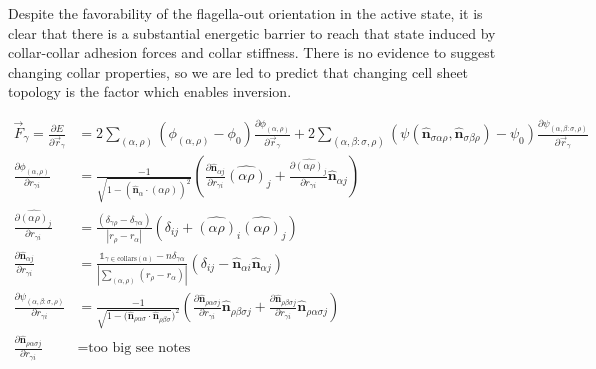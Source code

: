 Despite the favorability of the flagella-out orientation in the active state, it is clear that there is a substantial energetic barrier to reach that state induced by collar-collar adhesion forces and collar stiffness. 
There is no evidence to suggest changing collar properties, so we are led to predict that changing cell sheet topology is the factor which enables inversion.




\begin{align*}
    \vec{F}_\gamma = \frac{\partial E}{\partial \vec{r}_\gamma} &= 2 \sum_{(\alpha, \rho)} \left( \phi_{(\alpha,\rho)} - \phi_0 \right) \frac{\partial \phi_{(\alpha,\rho)}}{\partial \vec{r}_\gamma} + 2 \sum_{(\alpha, \beta: \sigma, \rho)} \left( \psi(\hat{\bm{n}}_{\sigma\alpha\rho}, \hat{\bm{n}}_{\sigma\beta\rho}) - \psi_0 \right) \frac{\partial \psi_{(\alpha, \beta: \sigma, \rho)}}{\partial \vec{r}_\gamma} \\
    \frac{\partial \phi_{(\alpha,\rho)}}{\partial r_{\gamma i}} &= \frac{-1}{\sqrt{1 - (\hat{\bm{n}}_\alpha \cdot \hat{(\alpha\rho)})^2}} \left(\frac{\partial \hat{\bm{n}}_{\alpha j}}{\partial r_{\gamma i}} \hat{(\alpha\rho)}_j + \frac{\partial \hat{(\alpha\rho)}_j}{\partial r_{\gamma i}} \hat{\bm{n}}_{\alpha j} \right) \\
    \frac{\partial \hat{(\alpha\rho)}_j}{\partial r_{\gamma i}} &= \frac{(\delta_{\gamma\rho} - \delta_{\gamma\alpha})}{|r_\rho - r_\alpha|} \left( \delta_{ij} + \hat{(\alpha\rho)}_i\hat{(\alpha\rho)}_j \right) \\
    \frac{\partial \hat{\bm{n}}_{\alpha j}}{\partial r_{\gamma i}} &= \frac{\mathbb{1}_{\gamma\in \text{collars}(\alpha)} - n\delta_{\gamma\alpha}}{\left| \sum_{(\alpha, \rho)} (r_\rho - r_\alpha) \right|} \left(\delta_{ij} - \hat{\bm{n}}_{\alpha i} \hat{\bm{n}}_{\alpha j} \right) \\
    \frac{\partial \psi_{(\alpha, \beta: \sigma, \rho)}}{\partial r_{\gamma i}} &= \frac{-1}{\sqrt{1 - (\hat{\bm{n}}_{\rho\alpha\sigma} \cdot \hat{\bm{n}}_{\rho\beta\sigma}})^2} \left(\frac{\partial \hat{\bm{n}}_{\rho\alpha\sigma j}}{\partial r_{\gamma i}} \hat{\bm{n}}_{\rho\beta\sigma j} + \frac{\partial \hat{\bm{n}}_{\rho\beta\sigma j}}{\partial r_{\gamma i}} \hat{\bm{n}}_{\rho\alpha\sigma j} \right) \\
    \frac{\partial \hat{\bm{n}}_{\rho\alpha\sigma j}}{\partial r_{\gamma i}} &= \text{too big see notes}
\end{align*}

